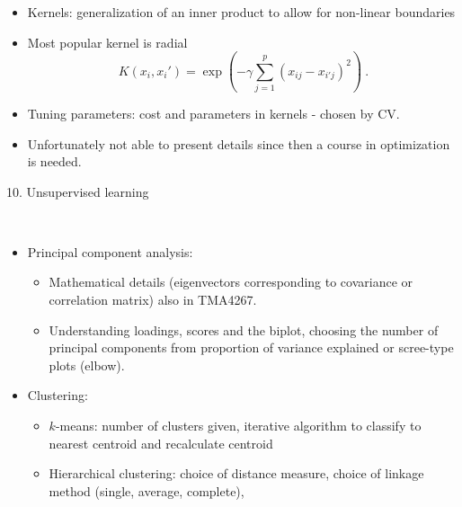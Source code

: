 \documentclass[10pt,ignorenonframetext,]{beamer}
\providecommand{\tightlist}{%
  \setlength{\itemsep}{0pt}\setlength{\parskip}{0pt}}
\begin{document}
\begin{frame}

\begin{itemize}
\item
  Kernels: generalization of an inner product to allow for non-linear
  boundaries
\item
  Most popular kernel is radial
  \[K(x_i,x_i')=\exp(-\gamma\sum_{j=1}^p (x_{ij}-x_{i'j})^2) \ . \]
\item
  Tuning parameters: cost and parameters in kernels - chosen by CV.
\end{itemize}

\vspace{2mm}

\begin{itemize}
\tightlist
\item
  Unfortunately not able to present details since then a course in
  optimization is needed.
\end{itemize}

\vspace{2mm}

\end{frame}

\begin{frame}

\begin{block}{10. Unsupervised learning}

\(~\)

\begin{itemize}
\tightlist
\item
  Principal component analysis:

  \begin{itemize}
  \tightlist
  \item
    Mathematical details (eigenvectors corresponding to covariance or
    correlation matrix) also in TMA4267.
  \item
    Understanding loadings, scores and the biplot, choosing the number
    of principal components from proportion of variance explained or
    scree-type plots (elbow).
  \end{itemize}
\end{itemize}

\vspace{2mm}

\begin{itemize}
\tightlist
\item
  Clustering:

  \begin{itemize}
  \tightlist
  \item
    \(k\)-means: number of clusters given, iterative algorithm to
    classify to nearest centroid and recalculate centroid
  \item
    Hierarchical clustering: choice of distance measure, choice of
    linkage method (single, average, complete),
  \end{itemize}
\end{itemize}

\end{block}

\end{frame}
\end{document}
